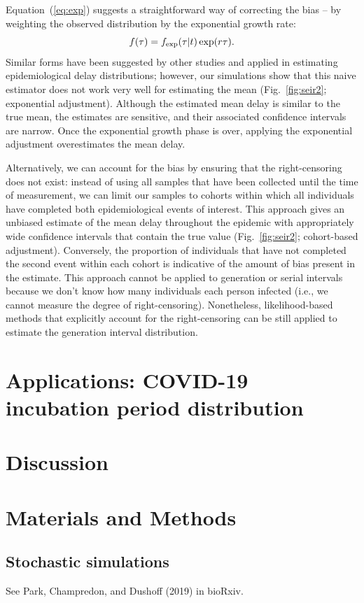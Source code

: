 \documentclass[12pt]{article}
\newcommand{\eref}[1]{(\ref{eq:#1})}
\newcommand{\fref}[1]{Fig.~\ref{fig:#1}}
\begin{document}
Equation~\eref{exp} suggests a straightforward way of correcting the bias -- by weighting the observed distribution by the exponential growth rate:
\begin{equation}
f(\tau) = f_{\tiny\textrm{exp}}(\tau|t) \exp(r \tau).
\end{equation}
Similar forms have been suggested by other studies and applied in estimating epidemiological delay distributions;
however, our simulations show that this naive estimator does not work very well for estimating the mean (\fref{seir2}; exponential adjustment).
Although the estimated mean delay is similar to the true mean, the estimates are sensitive, and their associated confidence intervals are narrow.
Once the exponential growth phase is over, applying the exponential adjustment overestimates the mean delay.

Alternatively, we can account for the bias by ensuring that the right-censoring does not exist:
instead of using all samples that have been collected until the time of measurement, we can limit our samples to cohorts within which all individuals have completed both epidemiological events of interest.
This approach gives an unbiased estimate of the mean delay throughout the epidemic with appropriately wide confidence intervals that contain the true value (\fref{seir2}; cohort-based adjustment).
Conversely, the proportion of individuals that have not completed the second event within each cohort is indicative of the amount of bias present in the estimate.
This approach cannot be applied to generation or serial intervals because we don't know how many individuals each person infected (i.e., we cannot measure the degree of right-censoring).
Nonetheless, likelihood-based methods that explicitly account for the right-censoring can be still applied to estimate the generation interval distribution.

\section{Applications: COVID-19 incubation period distribution}



\section{Discussion}



\section{Materials and Methods}

\subsection{Stochastic simulations}

See Park, Champredon, and Dushoff (2019) in bioRxiv.
\end{document}
